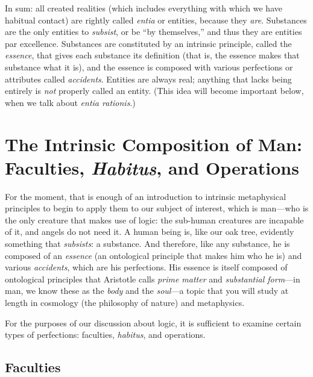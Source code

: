 \documentclass[article,12pt,a4paper,oneside]{memoir}
\begin{document}
    In sum: all created realities (which includes everything with which
    we have habitual contact) are rightly called \emph{entia} or
    entities, because they \emph{are}. Substances are the only entities
    to \emph{subsist}, or be ``by themselves,'' and thus they are
    entities par excellence. Substances are constituted by an intrinsic
    principle, called the \emph{essence}, that gives each substance its
    definition (that is, the essence makes that substance what it is),
    and the essence is composed with various perfections or attributes
    called \emph{accidents}. Entities are always real; anything that
    lacks being entirely is \emph{not} properly called an entity. (This
    idea will become important below, when we talk about \emph{entia
    rationis}.)

    \hypertarget{the-intrinsic-composition-of-man-faculties-habitus-and-operations}{%
    \section{\texorpdfstring{The Intrinsic Composition of Man:
    Faculties, \emph{Habitus}, and
    Operations}{The Intrinsic Composition of Man: Faculties, Habitus, and Operations}}\label{the-intrinsic-composition-of-man-faculties-habitus-and-operations}}

    For the moment, that is enough of an introduction to intrinsic
    metaphysical principles to begin to apply them to our subject of
    interest, which is man---who is the only creature that makes use of
    logic: the sub-human creatures are incapable of it, and angels do
    not need it. A human being is, like our oak tree, evidently
    something that \emph{subsists}: a substance. And therefore, like any
    substance, he is composed of an \emph{essence} (an ontological
    principle that makes him who he is) and various \emph{accidents},
    which are his perfections. His essence is itself composed of
    ontological principles that Aristotle calls \emph{prime matter} and
    \emph{substantial form}---in man, we know these as the \emph{body}
    and the \emph{soul}---a topic that you will study at length in
    cosmology (the philosophy of nature) and metaphysics.

    For the purposes of our discussion about logic, it is sufficient to
    examine certain types of perfections: faculties, \emph{habitus}, and
    operations.

    \hypertarget{faculties}{%
    \subsection{Faculties}\label{faculties}}
\end{document}
